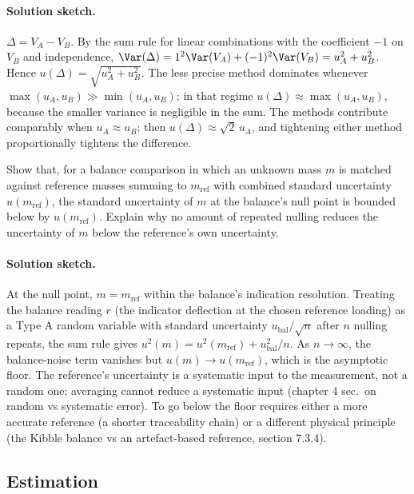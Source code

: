 \paragraph{Solution sketch.}
$\Delta = V_{A} - V_{B}$. By the sum rule for linear combinations
with the coefficient $-1$ on $V_{B}$ and independence, $\Var(\Delta)
= 1^{2} \Var(V_{A}) + (-1)^{2} \Var(V_{B}) = u_{A}^{2} + u_{B}^{2}$.
Hence $u(\Delta) = \sqrt{u_{A}^{2} + u_{B}^{2}}$. The less precise
method dominates whenever $\max(u_{A}, u_{B}) \gg \min(u_{A},
u_{B})$; in that regime $u(\Delta) \approx \max(u_{A}, u_{B})$,
because the smaller variance is negligible in the sum. The methods
contribute comparably when $u_{A} \approx u_{B}$; then $u(\Delta)
\approx \sqrt{2} \, u_{A}$, and tightening either method
proportionally tightens the difference.

\begin{exercise}
Show that, for a balance comparison in which an unknown mass $m$ is
matched against reference masses summing to $m_{\mathrm{ref}}$ with
combined standard uncertainty $u(m_{\mathrm{ref}})$, the standard
uncertainty of $m$ at the balance's null point is bounded below by
$u(m_{\mathrm{ref}})$. Explain why no amount of repeated nulling
reduces the uncertainty of $m$ below the reference's own
uncertainty.
\end{exercise}

\paragraph{Solution sketch.}
At the null point, $m = m_{\mathrm{ref}}$ within the balance's
indication resolution. Treating the balance reading $r$ (the
indicator deflection at the chosen reference loading) as a Type A
random variable with standard uncertainty $u_{\mathrm{bal}}/\sqrt{n}$
after $n$ nulling repeats, the sum rule gives
$u^{2}(m) = u^{2}(m_{\mathrm{ref}}) + u_{\mathrm{bal}}^{2}/n$.
As $n \to \infty$, the balance-noise term vanishes but $u(m) \to
u(m_{\mathrm{ref}})$, which is the asymptotic floor. The
reference's uncertainty is a systematic input to the measurement,
not a random one; averaging cannot reduce a systematic input
(chapter 4 sec.\ on random vs systematic error). To go below the
floor requires either a more accurate reference (a shorter
traceability chain) or a different physical principle (the Kibble
balance vs an artefact-based reference, section 7.3.4).

\subsection*{Estimation}


